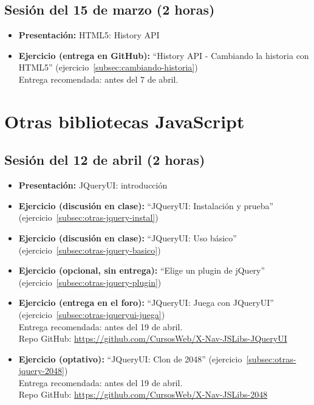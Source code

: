 \documentclass[a4paper,12pt]{report}
\begin{document}
\subsection{Sesión del 15 de marzo (2 horas)}

\begin{itemize}
 \item \textbf{Presentación:} HTML5: History API
 \item \textbf{Ejercicio (entrega en GitHub):} ``History API - Cambiando la historia con HTML5''
(ejercicio~\ref{subsec:cambiando-historia}) \\
 Entrega recomendada: antes del 7 de abril.
\end{itemize}


\section{Otras bibliotecas JavaScript}

\subsection{Sesión del 12 de abril (2 horas)}

\begin{itemize}
\item \textbf{Presentación:} JQueryUI: introducción
\item \textbf{Ejercicio (discusión en clase):} ``JQueryUI: Instalación y prueba'' (ejercicio~\ref{subsec:otras-jquery-instal})
\item \textbf{Ejercicio (discusión en clase):} ``JQueryUI: Uso básico'' (ejercicio~\ref{subsec:otras-jquery-basico}) \\
\item \textbf{Ejercicio (opcional, sin entrega):} ``Elige un plugin de jQuery'' (ejercicio~\ref{subsec:otras-jquery-plugin}) \\
\item \textbf{Ejercicio (entrega en el foro):} ``JQueryUI: Juega con JQueryUI'' (ejercicio~\ref{subsec:otras-jqueryui-juega}) \\
  Entrega recomendada: antes del 19 de abril. \\
  Repo GitHub: \url{https://github.com/CursosWeb/X-Nav-JSLibs-JQueryUI}
\item \textbf{Ejercicio (optativo):} ``JQueryUI: Clon de 2048'' (ejercicio~\ref{subsec:otras-jquery-2048}) \\
  Entrega recomendada: antes del 19 de abril. \\
  Repo GitHub: \url{https://github.com/CursosWeb/X-Nav-JSLibs-2048}
\end{itemize}
\end{document}

